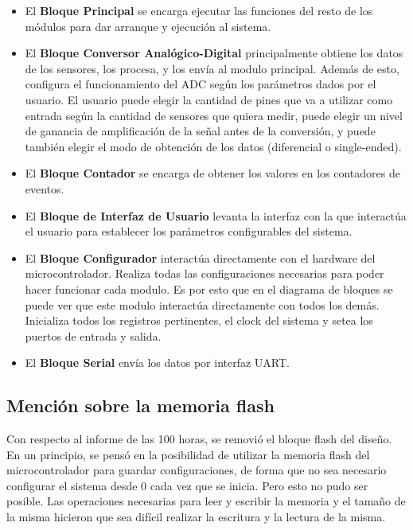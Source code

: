\begin{itemize}
  \item El \textbf{Bloque Principal} se encarga ejecutar las funciones del resto de los módulos para dar arranque y ejecución al sistema.
  \item El \textbf{Bloque Conversor Analógico-Digital} principalmente obtiene los datos de los sensores, los procesa, y los envía al modulo principal. Además de esto, configura el funcionamiento del ADC según los parámetros dados por el usuario. El usuario puede elegir la cantidad de pines que va a utilizar como entrada según la cantidad de sensores que quiera medir, puede elegir un nivel de ganancia de amplificación de la señal antes de la conversión, y puede también elegir el modo de obtención de los datos (diferencial o single-ended).
  \item El \textbf{Bloque Contador} se encarga de obtener los valores en los contadores de eventos.
  \item El \textbf{Bloque de Interfaz de Usuario} levanta la interfaz con la que interactúa el usuario para establecer los parámetros configurables del sistema.
  \item El \textbf{Bloque Configurador} interactúa directamente con el hardware del microcontrolador. Realiza todas las configuraciones necesarias para poder hacer funcionar cada modulo. Es por esto que en el diagrama de bloques se puede ver que este modulo interactúa directamente con todos los demás. Inicializa todos los registros pertinentes, el clock del sistema y setea los puertos de entrada y salida.
  \item El \textbf{Bloque Serial} envía los datos por interfaz UART.
\end{itemize}

\subsection{Mención sobre la memoria flash} %
\label{sub:mencion_sobre_la_memoria_flash}

Con respecto al informe de las 100 horas, se removió el bloque flash del diseño. En un principio, se pensó en la posibilidad de utilizar la memoria flash del microcontrolador para guardar configuraciones, de forma que no sea necesario configurar el sistema desde 0 cada vez que se inicia. Pero esto no pudo ser posible. Las operaciones necesarias para leer y escribir la memoria y el tamaño de la misma hicieron que sea difícil realizar la escritura y la lectura de la misma.

